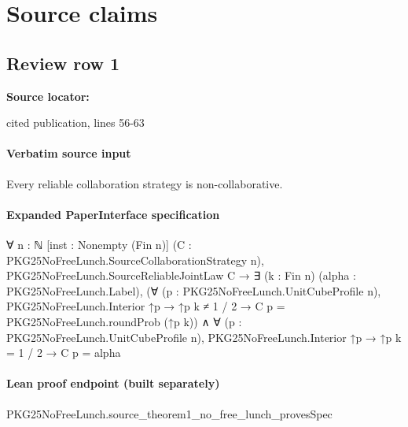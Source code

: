 \documentclass[10pt]{article}
\begin{document}
\clearpage
\hypertarget{source-claim-bf0315dd1a18c70e}{}
\hypertarget{source-section-f10b5f68e4acf3dc}{}
\section*{Source claims}
\subsection*{Review row 1}
\textbf{Source locator:} {\footnotesize\raggedright cited publication, lines 56-\allowbreak{}63\par}
\paragraph{Verbatim source input}
\begin{ReviewVerbatim}
\setcounter{theorem}{0}
\begin{theorem}\label{thm:main}
    Every reliable collaboration strategy is non-collaborative.




\end{theorem}
\end{ReviewVerbatim}



\paragraph{Expanded PaperInterface specification}
\begin{ReviewVerbatim}
∀ {n : ℕ} [inst : Nonempty (Fin n)] (C : PKG25NoFreeLunch.SourceCollaborationStrategy n),
  PKG25NoFreeLunch.SourceReliableJointLaw C →
    ∃ (k : Fin n) (alpha : PKG25NoFreeLunch.Label),
      (∀ (p : PKG25NoFreeLunch.UnitCubeProfile n),
          PKG25NoFreeLunch.Interior ↑p → ↑p k ≠ 1 / 2 → C p = PKG25NoFreeLunch.roundProb (↑p k)) ∧
        ∀ (p : PKG25NoFreeLunch.UnitCubeProfile n), PKG25NoFreeLunch.Interior ↑p → ↑p k = 1 / 2 → C p = alpha
\end{ReviewVerbatim}



\paragraph{Lean proof endpoint (built separately)}\begin{ReviewVerbatim}
PKG25NoFreeLunch.source_theorem1_no_free_lunch_provesSpec
\end{ReviewVerbatim}
\end{document}
